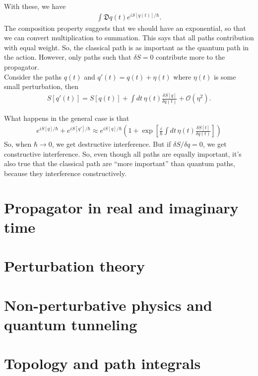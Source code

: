 \documentclass{book}
\theoremstyle{definition}
\newcommand{\f}[2]{\frac{#1}{#2}}
\newcommand{\lp}{\left(}
\newcommand{\rp}{\right)}
\newcommand{\lb}{\left[}
\newcommand{\rb}{\right]}
\begin{document}
With these, we have 
\begin{align}
\int \mathfrak{D}q(t) e^{iS[q(t)]/\hbar}.
\end{align}
The composition property suggests that we should have an exponential, so that we can convert multiplication to summation. This says that all paths contribution with equal weight. So, the classical path is as important as the quantum path in the action. However, only paths such that $\delta S = 0$ contribute more to the propagator. \\

Consider the paths $q(t)$ and $q'(t) = q(t) + \eta (t)$ where $\eta(t)$ is some small perturbation, then 
\begin{align}
S[q'(t)] = S[q(t)] + \int dt\, \eta(t) \f{\delta S[q]}{\delta q(t)} + \mathcal{O}(\eta^2).
\end{align}

What happens in the general case is that 
\begin{align}
e^{iS[q]/\hbar} + e^{iS[q']/\hbar} \approx  e^{iS[q]/\hbar}\lp 1 + \exp\lb \f{i}{\hbar} \int dt\, \eta(t) \f{\delta S[t]}{\delta q(t)} \rb \rp
\end{align}
So, when $\hbar \to 0$, we get destructive interference. But if $\delta S/\delta q = 0$, we get constructive interference. So, even though all paths are equally important, it's also true that the classical path are ``more important'' than quantum paths, because they interference constructively. 








\newpage
\section{Propagator in real and imaginary time}


\newpage

\section{Perturbation theory}


\newpage

\section{Non-perturbative physics and quantum tunneling}


\newpage


\section{Topology and path integrals}
\end{document}
